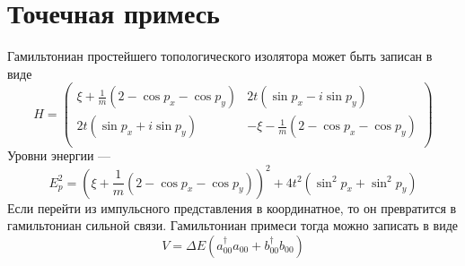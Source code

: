 \section{Точечная примесь}
Гамильтониан простейшего топологического изолятора может быть записан в виде
\begin{equation}
    \label{BHZ}
    H = \left(\begin{matrix}
            \xi + \frac{1}{m}(2 - \cos{p_x} - \cos{p_y}) & 2t(\sin{p_x} - i\sin{p_y})   \\
            2t(\sin{p_x} + i\sin{p_y}) & - \xi - \frac{1}{m}(2 - \cos{p_x} - \cos{p_y}) \\
        \end{matrix}\right)
\end{equation}
Уровни энергии ---
\begin{equation}
    E_p^2 = (\xi + \frac{1}{m}(2 - \cos{p_x} - \cos{p_y}))^2 + 4t^2(\sin^2{p_x} + \sin^2{p_y})
\end{equation}
Если перейти из импульсного представления в координатное, то он превратится в гамильтониан
сильной связи. Гамильтониан примеси тогда можно записать в виде
\begin{equation}
    V = \Delta E (a_{00}^\dagger a_{00} + b_{00}^\dagger b_{00})
\end{equation}
